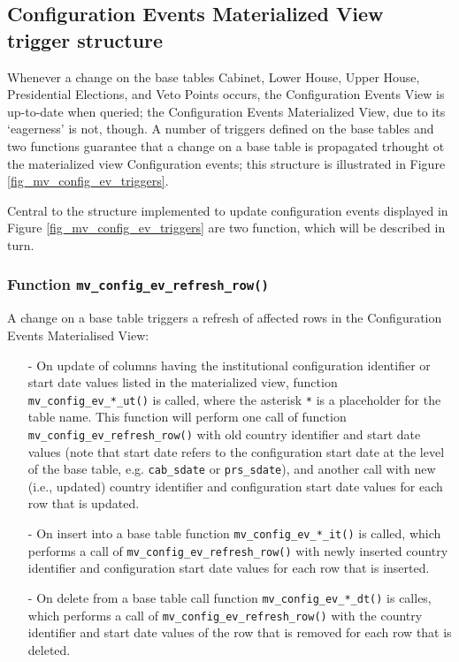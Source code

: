 \subsection{Configuration Events Materialized View trigger structure}\label{subsec_trigger_structure_mv_config_ev}

Whenever a change on the base tables Cabinet, Lower House, Upper House, Presidential Elections, and Veto Points occurs, the Configuration Events View is up-to-date when queried; the Configuration Events Materialized View, due to its `eagerness' is not, though.
A number of triggers defined on the base tables and two functions guarantee that a change on a base table is propagated trhought ot the materialized view Configuration events; this structure is illustrated in Figure \ref{fig_mv_config_ev_triggers}.

\label{fig_mv_config_ev_triggers}

Central to the structure implemented to update configuration events displayed in Figure \ref{fig_mv_config_ev_triggers} are two function, which will be described in turn.

\subsubsection{Function \texttt{mv\_config\_ev\_refresh\_row()}}

A change on a base table triggers a refresh of affected rows in the Configuration Events Materialised View:
\begin{itemize}

\item[-]{On update of columns having the institutional configuration identifier or start date values listed in the materialized view, function \texttt{mv\_config\_ev\_*\_ut()} is called, where the asterisk \texttt{*} is a placeholder for the table name.
This function will perform one call of function \texttt{mv\_config\_ev\_refresh\_row()} with old country identifier and start date values (note that start date refers to the configuration start date at the level of the base table, e.g. \texttt{cab\_sdate} or \texttt{prs\_sdate}), and another call with new (i.e., updated) country identifier and configuration start date values for each row that is updated.}

\item[-]{On insert into a base table function \texttt{mv\_config\_ev\_*\_it()} is called, which performs a call of \texttt{mv\_config\_ev\_refresh\_row()} with newly inserted country identifier and configuration start date values for each row that is inserted.}

\item[-]{On delete from a base table call function \texttt{mv\_config\_ev\_*\_dt()} is calles, which performs a call of \texttt{mv\_config\_ev\_refresh\_row()} with the country identifier and start date values of the row that is removed for each row that is deleted.}
\end{itemize}

